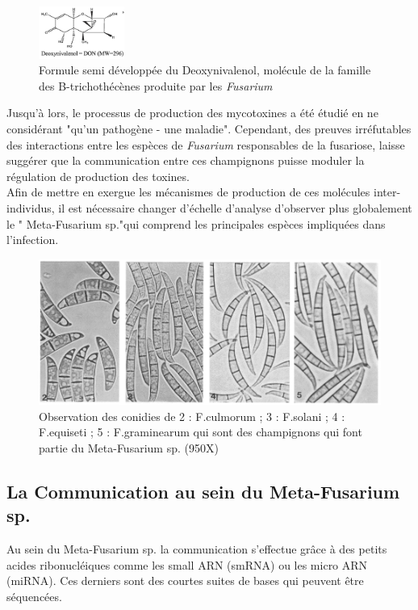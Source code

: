 \documentclass{report}
\begin{document}
\begin{figure}
    \centering
    \includegraphics[width=0.25\textwidth]{Images/fig_1.png}
    \caption{Formule semi développée du Deoxynivalenol, molécule de la famille des B-trichothécènes produite par les \textit{Fusarium}\cite{gaballah2023development}}
    \label{fig:mol}
\end{figure}

Jusqu’à lors, le processus de production des mycotoxines a été étudié en ne considérant "qu’un pathogène - une maladie". Cependant, des preuves irréfutables des interactions entre les espèces de \textit{Fusarium} responsables de la fusariose, laisse suggérer que la communication entre ces champignons puisse moduler la régulation de production des toxines.\\

Afin de mettre en exergue les mécanismes de production de ces molécules inter-individus, il est nécessaire changer d'échelle d'analyse d’observer plus globalement le " Meta-Fusarium sp."qui comprend les principales espèces impliquées dans l’infection.\cite{ponts2009fusarium, mycsa} \\

\begin{figure}
    \centering
    \includegraphics[width=.70\textwidth]{Images/fig_2.png}
    \caption{Observation des conidies de 2 : F.culmorum ; 3 : F.solani ; 4 : F.equiseti ; 5 : F.graminearum qui sont des champignons qui font partie du Meta-Fusarium sp. (950X) \cite{taxonomy}}
    \label{fig:fusa}
\end{figure}

\subsection{La Communication au sein du Meta-Fusarium sp.}
Au sein du Meta-Fusarium sp. la communication s’effectue grâce à des petits acides ribonucléiques comme les small ARN (smRNA) ou les micro ARN (miRNA). Ces derniers sont des courtes suites de bases qui peuvent être séquencées.\\
\end{document}
